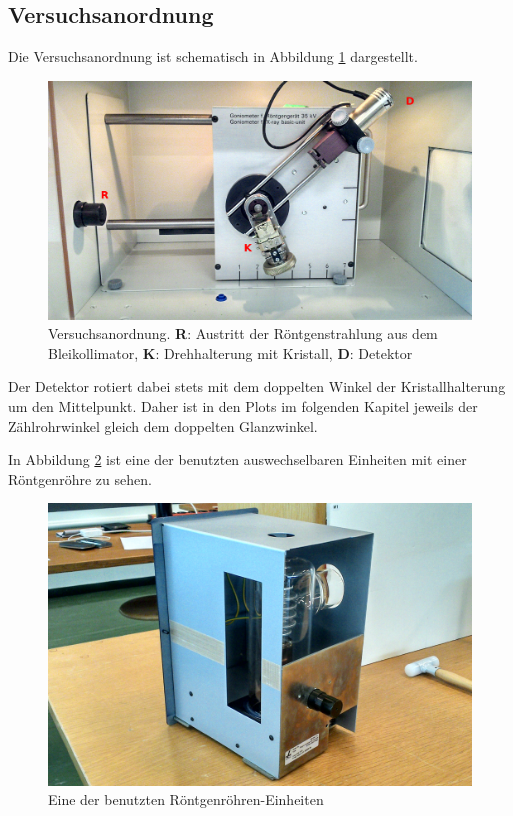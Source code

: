 \subsection{Versuchsanordnung}
\label{subsec:versuchsanordnung}

Die       Versuchsanordnung      ist       schematisch      in       Abbildung
\ref{fig:versuchsanordnung} dargestellt.

\begin{figure}[h!]
    \centering
    \includegraphics[width=.8\textwidth]{images/versuchsanordnung.jpg}
    \caption{%
        Versuchsanordnung.    \textbf{R}: Austritt   der    R\"ontgenstrahlung
        aus  dem   Bleikollimator,  \textbf{K}: Drehhalterung   mit  Kristall,
        \textbf{D}: Detektor
    }
    \label{fig:versuchsanordnung}
\end{figure}

Der   Detektor   rotiert   dabei   stets  mit   dem   doppelten   Winkel   der
Kristallhalterung  um den  Mittelpunkt. Daher ist  in den  Plots im  folgenden
Kapitel jeweils der Z\"ahlrohrwinkel gleich dem doppelten Glanzwinkel.

In Abbildung \ref{fig:roehre} ist eine der benutzten auswechselbaren Einheiten
mit einer R\"ontgenr\"ohre zu sehen.

\vspace{-0.5em}

\begin{figure}[h!]
    \centering
    \includegraphics[width=.55\textwidth]{images/roehre.jpg}
    \caption{%
        Eine der benutzten R\"ontgenr\"ohren-Einheiten
    }
    \label{fig:roehre}
\end{figure}


